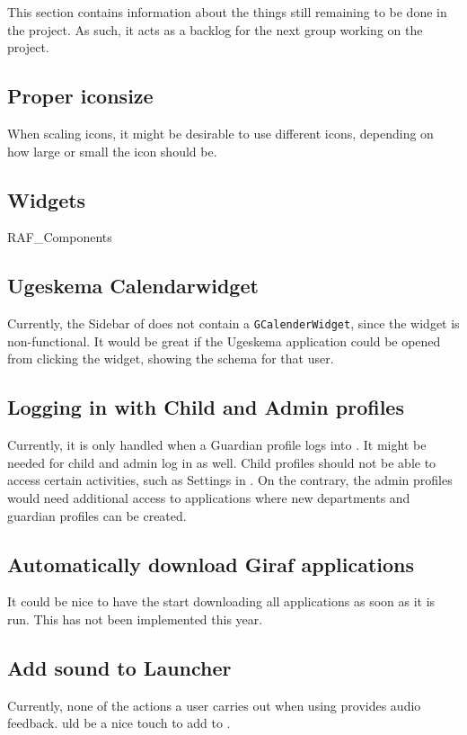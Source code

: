 This section contains information about the things still remaining to be done in the \launcher project.
As such, it acts as a backlog for the next group working on the project.

\subsection{Proper iconsize}
When scaling icons, it might be desirable to use different icons, depending on how large or small the icon should be.

\subsection{Widgets}
RAF\_Components

\subsection{Ugeskema Calendarwidget}
Currently, the Sidebar of \launcher does not contain a \lstinline!GCalenderWidget!, since the widget is non-functional.
It would be great if the Ugeskema application could be opened from clicking the widget, showing the schema for that user.

\subsection{Logging in with Child and Admin profiles}
Currently, it is only handled when a Guardian profile logs into \launcher.
It might be needed for child and admin log in as well.
Child profiles should not be able to access certain activities, such as Settings in \launcher.
On the contrary, the admin profiles would need additional access to applications where new departments and guardian profiles can be created.

\subsection{Automatically download Giraf applications}
It could be nice to have the \launcher start downloading all \giraf applications as soon as it is run.
This has not been implemented this year.

\subsection{Add sound to Launcher}
Currently, none of the actions a user carries out when using \launcher provides audio feedback.
uld be a nice touch to add to \launcher. 

